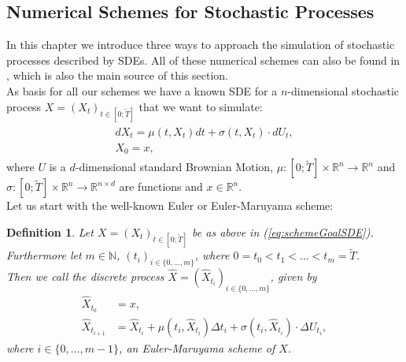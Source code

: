 \documentclass[12pt]{article}
\newtheorem{definition}[theorem]{Definition}
\begin{document}
	\subsection{Numerical Schemes for Stochastic Processes}
	In this chapter we introduce three ways to approach the simulation of stochastic processes described by SDEs. All of these numerical schemes can also be found in \cite{kloedenSchemes}, which is also the main source of this section.\\
	As basis for all our schemes we have a known SDE for a $n$-dimensional stochastic process $X=(X_t)_{t\in [0;\tilde{T}]}$ that we want to simulate:
	\begin{align}
		\begin{aligned}\label{eq:schemeGoalSDE}
		dX_t = \mu(t, X_t)dt + \sigma(t, X_t) \cdot dU_t,\\
		X_0 = x,
		\end{aligned}
	\end{align}
	where $U$ is a $d$-dimensional standard Brownian Motion, $\mu: [0;\tilde{T}] \times \mathbb{R}^n \rightarrow \mathbb{R}^n$ and $\sigma: [0;\tilde{T}] \times \mathbb{R}^n \rightarrow \mathbb{R}^{n \times d}$ are functions and $x \in \mathbb{R}^n$.\\
	Let us start with the well-known Euler or Euler-Maruyama scheme:
	\begin{definition}
		Let $X=(X_t)_{t\in [0;\tilde{T}]}$ be as above in (\ref{eq:schemeGoalSDE}).\\
		Furthermore let $m \in \mathbb{N}$, $(t_i)_{i\in \{0, ..., m\}}$, where $0=t_0 < t_1 < ... < t_m=\tilde{T}$.\\
		Then we call the discrete process $\hat{X} = (\hat{X}_{t_i})_{i \in \{0, ..., m\}}$, given by
		\begin{align*}
			\hat{X}_{t_0} &= x,\\
			\hat{X}_{t_{i+1}} &= \hat{X}_{t_{i}} + \mu(t_i, \hat{X}_{t_{i}})\Delta t_i + \sigma(t_i, \hat{X}_{t_{i}}) \cdot \Delta U_{t_i},
		\end{align*}
		where $i \in \{0, ..., m-1\}$, an \emph{Euler-Maruyama scheme of $X$}.
	\end{definition}
	
\end{document}
